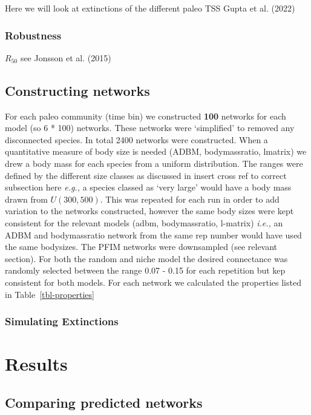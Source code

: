 \documentclass[
]{article}
\begin{document}
Here we will look at extinctions of the different paleo TSS Gupta et al.
(2022)

\subsubsection{Robustness}\label{robustness}

\(R_{50}\) see Jonsson et al. (2015)

\subsection{Constructing networks}\label{constructing-networks}

For each paleo community (time bin) we constructed \textbf{100} networks
for each model (so 6 * 100) networks. These networks were `simplified'
to removed any disconnected species. In total 2400 networks were
constructed. When a quantitative measure of body size is needed (ADBM,
bodymassratio, lmatrix) we drew a body mass for each species from a
uniform distribution. The ranges were defined by the different size
classes as discussed in insert cross ref to correct subsection here
\emph{e.g.,} a species classed as `very large' would have a body mass
drawn from \(U(300, 500)\). This was repeated for each run in order to
add variation to the networks constructed, however the same body sizes
were kept consistent for the relevant models (adbm, bodymassratio,
l-matrix) \emph{i.e.,} an ADBM and bodymassratio network from the same
rep number would have used the same bodysizes. The PFIM networks were
downsampled (see relevant section). For both the random and niche model
the desired connectance was randomly selected between the range 0.07 -
0.15 for each repetition but kep consistent for both models. For each
network we calculated the properties listed in
Table~\ref{tbl-properties}

\subsubsection{Simulating Extinctions}\label{simulating-extinctions}

\section{Results}\label{results}

\subsection{Comparing predicted
networks}\label{comparing-predicted-networks}
\end{document}
